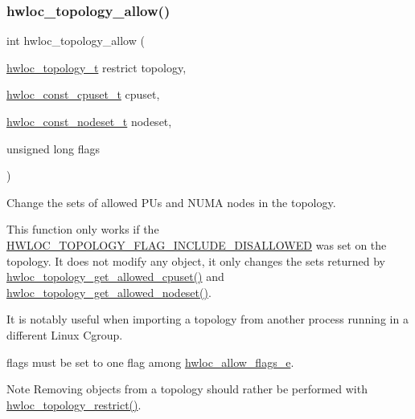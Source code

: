 \subsubsection{\texorpdfstring{hwloc\+\_\+topology\+\_\+allow()}{hwloc\_topology\_allow()}}
{\footnotesize\ttfamily int hwloc\+\_\+topology\+\_\+allow (\begin{DoxyParamCaption}\item[{\hyperlink{a00186_ga9d1e76ee15a7dee158b786c30b6a6e38}{hwloc\+\_\+topology\+\_\+t} restrict}]{topology,  }\item[{\hyperlink{a00183_ga1f784433e9b606261f62d1134f6a3b25}{hwloc\+\_\+const\+\_\+cpuset\+\_\+t}}]{cpuset,  }\item[{\hyperlink{a00183_ga2f5276235841ad66a79bedad16a5a10c}{hwloc\+\_\+const\+\_\+nodeset\+\_\+t}}]{nodeset,  }\item[{unsigned long}]{flags }\end{DoxyParamCaption})}



Change the sets of allowed P\+Us and N\+U\+MA nodes in the topology. 

This function only works if the \hyperlink{a00193_ggada025d3ec20b4b420f8038d23d6e7bdea10907044bbb306fd0dc76acf046d9258}{H\+W\+L\+O\+C\+\_\+\+T\+O\+P\+O\+L\+O\+G\+Y\+\_\+\+F\+L\+A\+G\+\_\+\+I\+N\+C\+L\+U\+D\+E\+\_\+\+D\+I\+S\+A\+L\+L\+O\+W\+ED} was set on the topology. It does not modify any object, it only changes the sets returned by \hyperlink{a00202_ga517d5d68ec9f24583d8933aab713be8e}{hwloc\+\_\+topology\+\_\+get\+\_\+allowed\+\_\+cpuset()} and \hyperlink{a00202_ga21a4d7237a11e76b912ed4524ab78cbd}{hwloc\+\_\+topology\+\_\+get\+\_\+allowed\+\_\+nodeset()}.

It is notably useful when importing a topology from another process running in a different Linux Cgroup.

{\ttfamily flags} must be set to one flag among \hyperlink{a00194_ga38b1be3922094d880f6e76bf56c973d6}{hwloc\+\_\+allow\+\_\+flags\+\_\+e}.

\begin{DoxyNote}{Note}
Removing objects from a topology should rather be performed with \hyperlink{a00194_ga6db81ed13ac0a9d70cc80372ab537815}{hwloc\+\_\+topology\+\_\+restrict()}. 
\end{DoxyNote}
\mbox{\label{a00194_ga1fc6012b3e1c249b83f48cb7bcacaa5b}} 
